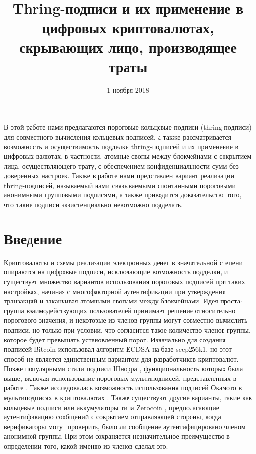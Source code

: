 \documentclass{mrl}
\title{Thring-подписи и их применение в цифровых криптовалютах, скрывающих лицо, производящее траты}
\date{1 ноября 2018}
\theoremstyle{definition}
\numberwithin{theorem}{subsection}
\begin{document}
\begin{center}
{}
\end{center}

В этой работе нами предлагаются пороговые кольцевые подписи (thring-подписи) для совместного вычисления кольцевых подписей, а также рассматривается возможность и осуществимость подделки thring-подписей и их применение в цифровых валютах, в частности, атомные свопы между блокчейнами с сокрытием лица, осуществляющего трату, с обеспечением конфиденциальности сумм без доверенных настроек. Также в работе нами представлен вариант реализации thring-подписей, называемый нами связываемыми спонтанными пороговыми анонимными групповыми подписями, а также приводится доказательство того, что такие подписи экзистенциально невозможно подделать.

\section{Введение}

Криптовалюты и схемы реализации электронных денег в значительной степени опираются на цифровые подписи, исключающие возможность подделки, и существует множество вариантов использования пороговых подписей при таких настройках, начиная с многофакторной аутентификации при утверждении транзакций и заканчивая атомными свопами между блокчейнами. Идея проста: группа взаимодействующих пользователей принимает решение относительно порогового значения, и некоторые из членов группы могут совместно вычислить подписи, но только при условии, что согласится такое количество членов группы, которое будет превышать установленный порог. Изначально для создания подписей Bitcoin использовал алгоритм ECDSA на базе secp256k1, но этот способ не является единственным вариантом для разработчиков криптовалют. Позже популярными стали подписи Шнорра \cite{schnorr1991efficient}, функциональность которых была выше, включая использование пороговых мультиподписей, представленных в работе \cite{maxwell2018simple}. Также исследовалась возможность использования подписей Окамото \cite{okamoto1992provably} в мультиподписях в криптовалютах \cite{drijvers2018okamoto}. Также существуют другие варианты, такие как кольцевые подписи \cite{liu2004linkable} или аккумуляторы типа Zerocoin \cite{miers2013zerocoin} , предполагающие аутентификацию сообщений с сокрытием отправляющей стороны, когда верификаторы могут проверить, было ли сообщение аутентифицировано членом анонимной группы. При этом сохраняется незначительное преимущество в определении того, какой именно из членов сделал это.
\end{document}
